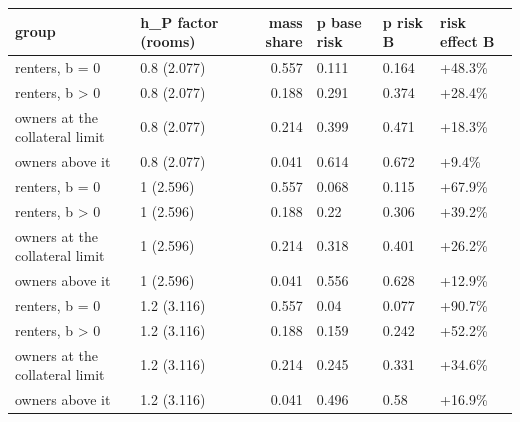 \begingroup\small
\setlength{\tabcolsep}{3pt}
\renewcommand{\arraystretch}{1.04}
\begin{tabularx}{\linewidth}{XXrXXX}
\toprule
group & h\_P factor (rooms) & mass share & p base risk & p risk B & risk effect B \\
\midrule
renters, b = 0 & 0.8 (2.077) & 0.557 & 0.111 & 0.164 & +48.3\% \\
renters, b \textgreater{} 0 & 0.8 (2.077) & 0.188 & 0.291 & 0.374 & +28.4\% \\
owners at the collateral limit & 0.8 (2.077) & 0.214 & 0.399 & 0.471 & +18.3\% \\
owners above it & 0.8 (2.077) & 0.041 & 0.614 & 0.672 & +9.4\% \\
renters, b = 0 & 1 (2.596) & 0.557 & 0.068 & 0.115 & +67.9\% \\
renters, b \textgreater{} 0 & 1 (2.596) & 0.188 & 0.22 & 0.306 & +39.2\% \\
owners at the collateral limit & 1 (2.596) & 0.214 & 0.318 & 0.401 & +26.2\% \\
owners above it & 1 (2.596) & 0.041 & 0.556 & 0.628 & +12.9\% \\
renters, b = 0 & 1.2 (3.116) & 0.557 & 0.04 & 0.077 & +90.7\% \\
renters, b \textgreater{} 0 & 1.2 (3.116) & 0.188 & 0.159 & 0.242 & +52.2\% \\
owners at the collateral limit & 1.2 (3.116) & 0.214 & 0.245 & 0.331 & +34.6\% \\
owners above it & 1.2 (3.116) & 0.041 & 0.496 & 0.58 & +16.9\% \\
\bottomrule
\end{tabularx}
\endgroup
